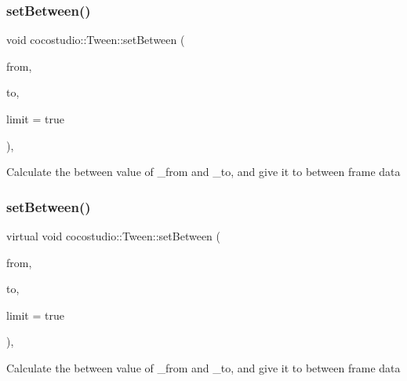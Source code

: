 \subsubsection{\texorpdfstring{set\+Between()}{setBetween()}\hspace{0.1cm}{\footnotesize\ttfamily [1/2]}}
{\footnotesize\ttfamily void cocostudio\+::\+Tween\+::set\+Between (\begin{DoxyParamCaption}\item[{\hyperlink{classcocostudio_1_1FrameData}{Frame\+Data} $\ast$}]{from,  }\item[{\hyperlink{classcocostudio_1_1FrameData}{Frame\+Data} $\ast$}]{to,  }\item[{bool}]{limit = {\ttfamily true} }\end{DoxyParamCaption})\hspace{0.3cm}{\ttfamily [protected]}, {\ttfamily [virtual]}}

Calculate the between value of \+\_\+from and \+\_\+to, and give it to between frame data \mbox{\label{classcocostudio_1_1Tween_a36a9be6a865b79194f4b3c567d2e7226}} 
\subsubsection{\texorpdfstring{set\+Between()}{setBetween()}\hspace{0.1cm}{\footnotesize\ttfamily [2/2]}}
{\footnotesize\ttfamily virtual void cocostudio\+::\+Tween\+::set\+Between (\begin{DoxyParamCaption}\item[{\hyperlink{classcocostudio_1_1FrameData}{Frame\+Data} $\ast$}]{from,  }\item[{\hyperlink{classcocostudio_1_1FrameData}{Frame\+Data} $\ast$}]{to,  }\item[{bool}]{limit = {\ttfamily true} }\end{DoxyParamCaption})\hspace{0.3cm}{\ttfamily [protected]}, {\ttfamily [virtual]}}

Calculate the between value of \+\_\+from and \+\_\+to, and give it to between frame data \mbox{\label{classcocostudio_1_1Tween_ae8e912a19e1b4a79056977912dd7f4e4}} 
